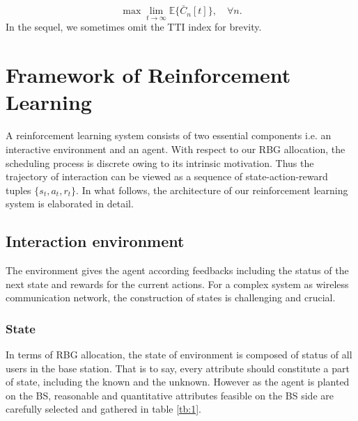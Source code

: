\documentclass[conference,compsocconf]{IEEEtran}
\begin{document}
$$\max\lim_{t\rightarrow\infty}\mathbb{E}\{\bar{C}_n[t]\}, \quad\forall n.$$
In the sequel, we sometimes omit the TTI index for brevity.
%
%
%

\section{Framework of Reinforcement Learning}
A reinforcement learning system consists of two essential components i.e. an interactive environment and an agent. With respect to our RBG allocation, the scheduling process is discrete owing to its intrinsic motivation.
Thus the trajectory of interaction can be viewed as a sequence of state-action-reward tuples $
\{s_t, a_t, r_t\}$. In what follows, the architecture of our reinforcement learning system is elaborated in detail.
\subsection{Interaction environment}
The environment gives the agent according feedbacks including the status of the next state and rewards for the current actions. For a complex system as wireless communication network, the construction of states is challenging and crucial.
\subsubsection{State}
In terms of RBG allocation, the state of environment is composed of status of all users in the base station. That is to say, every attribute should constitute a part of state, including the known and the unknown. However as the agent is planted on the BS, reasonable and quantitative attributes feasible on the BS side are carefully selected and gathered in table \ref{tb:1}.
\end{document}

